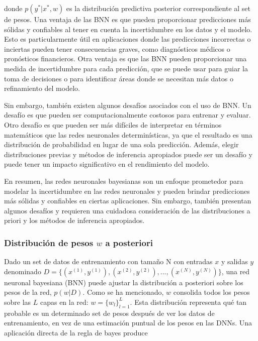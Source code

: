 \documentclass[10pt, oneside, a4paper]{article}
\begin{document}
	
	donde $p(y^{*} | x^{*}, w)$ es la distribución predictiva posterior correspondiente al set de pesos. 
	Una ventaja de las BNN es que pueden proporcionar predicciones más sólidas y confiables al tener en cuenta la incertidumbre en los datos y el modelo. Esto es particularmente útil en aplicaciones donde las predicciones incorrectas o inciertas pueden tener consecuencias graves, como diagnósticos médicos o pronósticos financieros. Otra ventaja es que las BNN pueden proporcionar una medida de incertidumbre para cada predicción, que se puede usar para guiar la toma de decisiones o para identificar áreas donde se necesitan más datos o refinamiento del modelo.
	
	Sin embargo, también existen algunos desafíos asociados con el uso de BNN. Un desafío es que pueden ser computacionalmente costosos para entrenar y evaluar. Otro desafío es que pueden ser más difíciles de interpretar en términos matemáticos que las redes neuronales determinísticas, ya que el resultado es una distribución de probabilidad en lugar de una sola predicción. Además, elegir distribuciones previas y métodos de inferencia apropiados puede ser un desafío y puede tener un impacto significativo en el rendimiento del modelo.
	
	En resumen, las redes neuronales bayesianas son un enfoque prometedor para modelar la incertidumbre en las redes neuronales y pueden brindar predicciones más sólidas y confiables en ciertas aplicaciones. Sin embargo, también presentan algunos desafíos y requieren una cuidadosa consideración de las distribuciones a priori y los métodos de inferencia apropiados.
	
	\subsubsection{Distribución de pesos $w$ a posteriori}
	
	\sloppy  Dado un set de datos de entrenamiento con tamaño N con entradas $x$ y salidas $y$ denominado $D = \{(x^{(1)},y^{(1)}),(x^{(2)},y^{(2)}),...,(x^{(N)},y^{(N)})\} $, una red neuronal bayesiana (BNN) puede ajustar la distribución a posteriori sobre los pesos de la red, $p(w|D)$. Como se ha mencionado, $w$ consolida todos los pesos sobre las $L$ capas en la red: $w = \{w_{l}\}^{L}_{l=1}$. Esta distribución representa qué tan probable es un determinado set de pesos después de ver los datos de entrenamiento, en vez de una estimación puntual de los pesos en las DNNs. Una aplicación directa de la regla de bayes produce 
	
\end{document}
